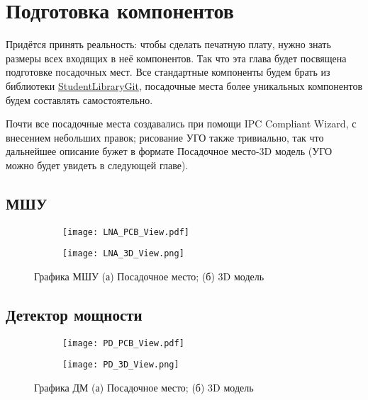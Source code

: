 \chapter{Подготовка компонентов} \label{chap:altium-components}

Придётся принять реальность: чтобы сделать печатную плату, нужно знать размеры всех входящих в неё компонентов. Так что эта глава будет посвящена подготовке посадочных мест. 
Все стандартные компоненты будем брать из библиотеки \href{https://github.com/dee3mon/StudentsLibraryGIT}{StudentLibraryGit}, посадочные места более уникальных компонентов будем составлять самостоятельно. 

Почти все посадочные места создавались при помощи IPC Compliant Wizard, с внесением небольших правок; рисование УГО также тривиально, так что дальнейшее описание бужет в формате Посадочное место-3D модель (УГО можно будет увидеть в следующей главе).

\section{МШУ}

\begin{figure}[H]
	\centering

	\begin{subfigure}[b]{0.45\textwidth}
		\centering
		\texttt{[image: LNA\_PCB\_View.pdf]}
		\caption{}%
		\label{fig:LNA_PCB_View}
	\end{subfigure}
	\hfill
	\begin{subfigure}[b]{0.45\textwidth}
		\centering
		\texttt{[image: LNA\_3D\_View.png]}
		\caption{}%
		\label{fig:LNA_3D_View}
	\end{subfigure}
	\caption{%
		Графика МШУ
		(а) Посадочное место;
		(б) 3D модель
	}%
	\label{fig:LNA_footprint}
\end{figure}

\section{Детектор мощности}

\begin{figure}[H]
	\centering
	\begin{subfigure}[b]{0.45\textwidth}
		\centering
		\texttt{[image: PD\_PCB\_View.pdf]}
		\caption{}%
		\label{fig:PD_PCB_View}
	\end{subfigure}
	\hfill
	\begin{subfigure}[b]{0.45\textwidth}
		\centering
		\texttt{[image: PD\_3D\_View.png]}
		\caption{}%
		\label{fig:PD_3D_View}
	\end{subfigure}
	\caption{%
		Графика ДМ
		(а) Посадочное место;
		(б) 3D модель
	}%
	\label{fig:PD_footprint}
\end{figure}

